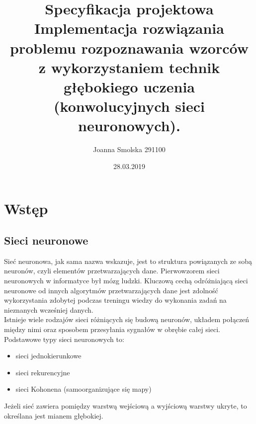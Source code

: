 \documentclass[a4paper,12pt]{article}
\begin{document}
\title{Specyfikacja projektowa\\{\small Implementacja rozwiązania problemu rozpoznawania wzorców z wykorzystaniem technik głębokiego uczenia (konwolucyjnych sieci neuronowych).}}


\bigbreak

\author{Joanna Smolska 291100}

\date{28.03.2019}

\maketitle

\thispagestyle{empty}

\pagebreak

\tableofcontents

\pagestyle{fancy}

\fancyhead{}

\cfoot{\thepage\ / \pageref{LastPage}}

\pagebreak

\section{Wstęp}

\subsection{Sieci neuronowe}

Sieć neuronowa, jak sama nazwa wskazuje, jest to struktura powiązanych ze sobą neuronów, czyli elementów przetwarzających dane. Pierwowzorem sieci neuronowych w informatyce był mózg ludzki. Kluczową cechą odróżniającą sieci neuronowe od innych algorytmów przetwarzających dane jest zdolność wykorzystania zdobytej podczas treningu wiedzy do wykonania zadań na nieznanych wcześniej danych.\\

Istnieje wiele rodzajów sieci różniących się budową neuronów, układem połączeń między nimi oraz sposobem przesyłania sygnałów w obrębie całej sieci. Podstawowe typy sieci neuronowych to:
\begin{itemize}
\item sieci jednokierunkowe 
\item sieci rekurencyjne
\item sieci Kohonena (samoorganizujące się mapy)
\end{itemize}


Jeżeli sieć zawiera pomiędzy warstwą wejściową a wyjściową warstwy ukryte, to określana jest mianem głębokiej.
\end{document}
